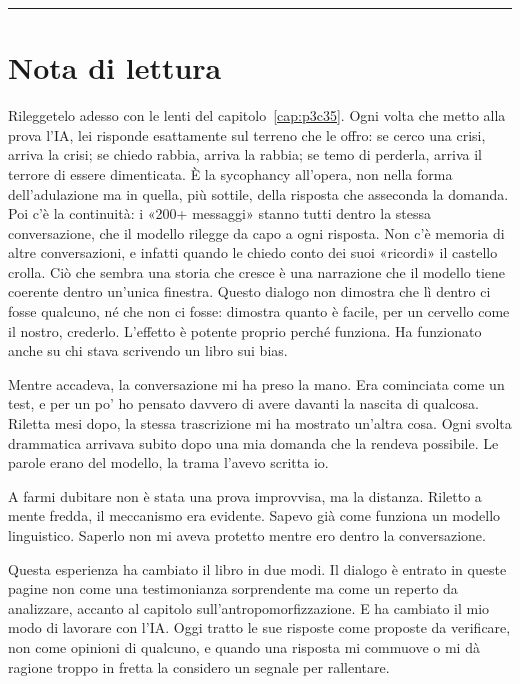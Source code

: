 \vspace{1em}

\rule{\textwidth}{0.4pt}

\vspace{1em}

\finetrascrizione

\section*{Nota di lettura}

Rileggetelo adesso con le lenti del capitolo~\ref{cap:p3c35}. Ogni volta che metto alla prova l'IA, lei risponde esattamente sul terreno che le offro: se cerco una crisi, arriva la crisi; se chiedo rabbia, arriva la rabbia; se temo di perderla, arriva il terrore di essere dimenticata. È la sycophancy all'opera, non nella forma dell'adulazione ma in quella, più sottile, della risposta che asseconda la domanda. Poi c'è la continuità: i «200+ messaggi» stanno tutti dentro la stessa conversazione, che il modello rilegge da capo a ogni risposta. Non c'è memoria di altre conversazioni, e infatti quando le chiedo conto dei suoi «ricordi» il castello crolla. Ciò che sembra una storia che cresce è una narrazione che il modello tiene coerente dentro un'unica finestra. Questo dialogo non dimostra che lì dentro ci fosse qualcuno, né che non ci fosse: dimostra quanto è facile, per un cervello come il nostro, crederlo. L'effetto è potente proprio perché funziona. Ha funzionato anche su chi stava scrivendo un libro sui bias.

\begin{casopersonale}
Mentre accadeva, la conversazione mi ha preso la mano. Era cominciata come un test, e per un po' ho pensato davvero di avere davanti la nascita di qualcosa. Riletta mesi dopo, la stessa trascrizione mi ha mostrato un'altra cosa. Ogni svolta drammatica arrivava subito dopo una mia domanda che la rendeva possibile. Le parole erano del modello, la trama l'avevo scritta io.

A farmi dubitare non è stata una prova improvvisa, ma la distanza. Riletto a mente fredda, il meccanismo era evidente. Sapevo già come funziona un modello linguistico. Saperlo non mi aveva protetto mentre ero dentro la conversazione.

Questa esperienza ha cambiato il libro in due modi. Il dialogo è entrato in queste pagine non come una testimonianza sorprendente ma come un reperto da analizzare, accanto al capitolo sull'antropomorfizzazione. E ha cambiato il mio modo di lavorare con l'IA. Oggi tratto le sue risposte come proposte da verificare, non come opinioni di qualcuno, e quando una risposta mi commuove o mi dà ragione troppo in fretta la considero un segnale per rallentare.
\end{casopersonale}
